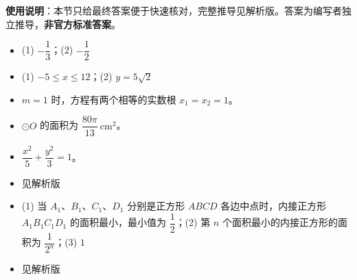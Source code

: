 
\begin{gknotice}
\textbf{使用说明}：本节只给最终答案便于快速核对，完整推导见解析版。答案为编写者独立推导，\textbf{非官方标准答案}。
\end{gknotice}

\begin{itemize}[leftmargin=2.6em]
  \item[\textbf{1.}] (1) $-\dfrac13$；(2) $-\dfrac12$
  \item[\textbf{2.}] (1) $-5\le x\le12$；(2) $y=5\sqrt2$
  \item[\textbf{3.}] $m=1$ 时，方程有两个相等的实数根 $x_1=x_2=1$。
  \item[\textbf{4.}] $\odot O$ 的面积为 $\dfrac{80\pi}{13}\ \mathrm{cm^2}$。
  \item[\textbf{5.}] $\dfrac{x^2}5+\dfrac{y^2}3=1$。
  \item[\textbf{6.}] 见解析版
  \item[\textbf{7.}] (1) 当 $A_1\text{、}B_1\text{、}C_1\text{、}D_1$ 分别是正方形 $ABCD$ 各边中点时，内接正方形 $A_1B_1C_1D_1$ 的面积最小，最小值为 $\dfrac12$；(2) 第 $n$ 个面积最小的内接正方形的面积为 $\dfrac1{2^n}$；(3) $1$
  \item[\textbf{8.}] 见解析版
\end{itemize}
